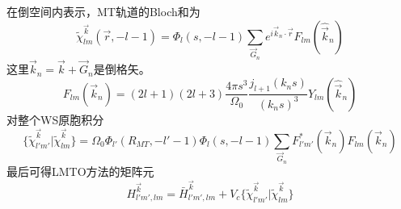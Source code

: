 在倒空间内表示，MT轨道的Bloch和为
\begin{equation}
  \tilde\chi_{lm}^{\vec k}(\vec r,-l-1)=\Phi_l(s,-l-1)\sum_{\vec G_n}e^{i\vec k_n\cdot\vec r}F_{lm}(\hat{\vec k}_n)
  \label{eq:solid-179}
\end{equation}
这里$\vec k_n=\vec k+\vec G_n$是倒格矢。
\begin{equation}
  F_{lm}(\vec k_n)=(2l+1)(2l+3)\frac{4\pi s^3}{\Omega_0}\frac{j_{l+1}(k_ns)}{(k_n s)^3}Y_{lm}(\hat{\vec k}_n)
  \label{eq:solid-180}
\end{equation}
对整个WS原胞积分
\begin{equation}
  \{\tilde\chi_{l'm'}^{\vec k}|\tilde\chi_{lm}^{\vec k}\}=\Omega_0\Phi_{l'}(R_{MT},-l'-1)\Phi_l(s,-l-1)\sum_{\vec G_n}F_{l'm'}^{\ast}(\vec k_n)F_{lm}(\vec k_n)
  \label{eq:solid-181}
\end{equation}
最后可得LMTO方法的矩阵元
\begin{equation}
  H_{l'm',lm}^{\vec k}=\bar H_{l'm',lm}^{\vec k}+V_c\{\tilde\chi_{l'm'}^{\vec k}|\tilde\chi_{lm}^{\vec k}\}
  \label{eq:solid-182}
\end{equation}
